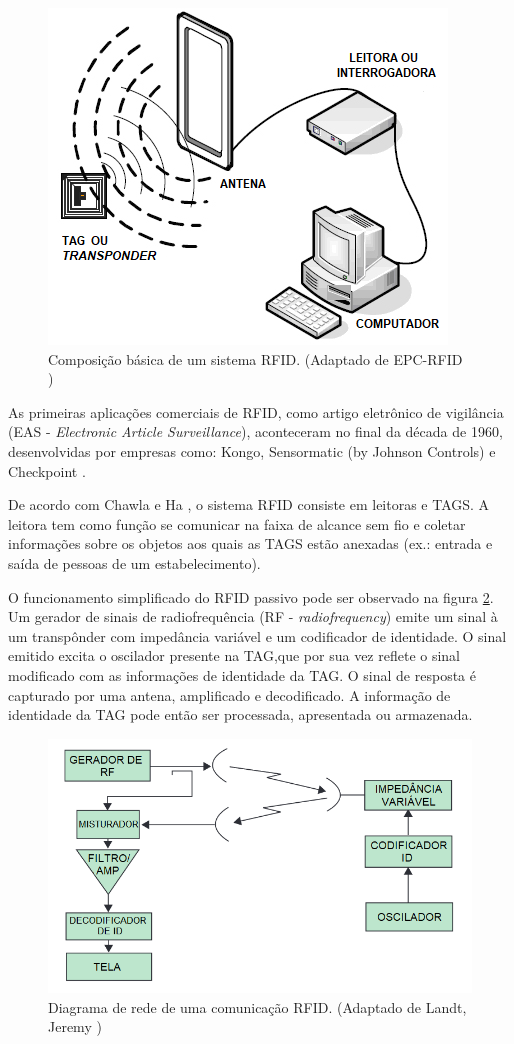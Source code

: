 \begin{figure}[h]
    \centering
    \includegraphics[width=0.6\linewidth]{figs/Fundamentos/Composicao.png}
    \caption{Composição básica de um sistema RFID. (Adaptado de EPC-RFID \cite{EPC-RFID-link})}
    \label{fig:ComposicaoRFID}
\end{figure}


As primeiras aplicações comerciais de RFID, como artigo eletrônico de vigilância (EAS - \textit{Electronic Article Surveillance}), aconteceram no final da década de 1960, desenvolvidas por empresas como: Kongo, Sensormatic (by Johnson Controls) e Checkpoint \cite{chawla2007overview}.

De acordo com Chawla e Ha \cite{chawla2007overview}, o sistema RFID consiste em leitoras e TAGS. A leitora tem como função se comunicar na faixa de alcance sem fio e coletar informações sobre os objetos aos quais as TAGS estão anexadas (ex.: entrada e saída de pessoas de um estabelecimento).

O funcionamento simplificado do RFID passivo pode ser observado na figura \ref{fig:DiagramaRFID}. Um gerador de sinais de radiofrequência (RF - \textit{radiofrequency}) emite um sinal à um transpônder com impedância variável e um codificador de identidade. O sinal emitido excita o oscilador presente na TAG,que por sua vez reflete o sinal modificado com as informações de identidade da TAG. O sinal de resposta é capturado por uma antena, amplificado e decodificado. A informação de identidade da TAG pode então ser processada, apresentada ou armazenada.

\begin{figure}[h]
    \centering
    \includegraphics[width=0.6\linewidth]{figs/Fundamentos/RFIDdiagram.png}
    \caption{Diagrama de rede de uma comunicação RFID. (Adaptado de Landt, Jeremy \cite{landt2005history})}
    \label{fig:DiagramaRFID}
\end{figure}

